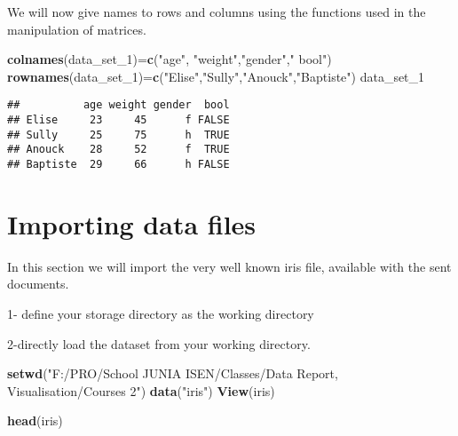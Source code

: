 \documentclass[
]{article}
\newenvironment{Shaded}{\begin{snugshade}}{\end{snugshade}}
\newcommand{\FunctionTok}[1]{\textcolor[rgb]{0.13,0.29,0.53}{\textbf{#1}}}
\newcommand{\NormalTok}[1]{#1}
\newcommand{\OtherTok}[1]{\textcolor[rgb]{0.56,0.35,0.01}{#1}}
\newcommand{\StringTok}[1]{\textcolor[rgb]{0.31,0.60,0.02}{#1}}
\begin{document}
We will now give names to rows and columns using the functions used in
the manipulation of matrices.

\begin{Shaded}
\begin{Highlighting}[]
\FunctionTok{colnames}\NormalTok{(data\_set\_1)}\OtherTok{=}\FunctionTok{c}\NormalTok{(}\StringTok{"age"}\NormalTok{, }\StringTok{"weight"}\NormalTok{,}\StringTok{"gender"}\NormalTok{,}\StringTok{" bool"}\NormalTok{)}
\FunctionTok{rownames}\NormalTok{(data\_set\_1)}\OtherTok{=}\FunctionTok{c}\NormalTok{(}\StringTok{"Elise"}\NormalTok{,}\StringTok{"Sully"}\NormalTok{,}\StringTok{"Anouck"}\NormalTok{,}\StringTok{"Baptiste"}\NormalTok{)}
\NormalTok{data\_set\_1}
\end{Highlighting}
\end{Shaded}

\begin{verbatim}
##          age weight gender  bool
## Elise     23     45      f FALSE
## Sully     25     75      h  TRUE
## Anouck    28     52      f  TRUE
## Baptiste  29     66      h FALSE
\end{verbatim}

\hypertarget{importing-data-files}{%
\section{Importing data files}\label{importing-data-files}}

In this section we will import the very well known iris file, available
with the sent documents.

1- define your storage directory as the working directory

2-directly load the dataset from your working directory.

\begin{Shaded}
\begin{Highlighting}[]
\FunctionTok{setwd}\NormalTok{(}\StringTok{"F:/PRO/School JUNIA ISEN/Classes/Data Report, Visualisation/Courses 2"}\NormalTok{)}
\FunctionTok{data}\NormalTok{(}\StringTok{"iris"}\NormalTok{)}
\FunctionTok{View}\NormalTok{(iris)}
\end{Highlighting}
\end{Shaded}

\begin{Shaded}
\begin{Highlighting}[]
\FunctionTok{head}\NormalTok{(iris)}
\end{Highlighting}
\end{Shaded}
\end{document}
